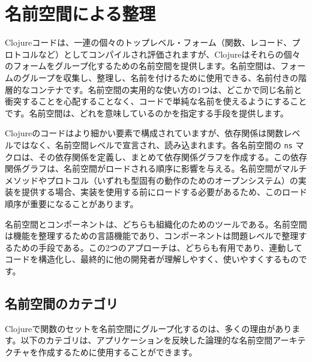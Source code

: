 \section{名前空間による整理}

Clojureコードは、一連の個々のトップレベル・フォーム（関数、レコード、プロトコルなど）としてコンパイルされ評価されますが、Clojureはそれらの個々のフォームをグループ化するための名前空間を提供します。名前空間は、フォームのグループを収集し、整理し、名前を付けるために使用できる、名前付きの階層的なコンテナです。名前空間の実用的な使い方の1つは、どこかで同じ名前と衝突することを心配することなく、コードで単純な名前を使えるようにすることです。名前空間は、どれを意味しているのかを指定する手段を提供します。

Clojureのコードはより細かい要素で構成されていますが、依存関係は関数レベルではなく、名前空間レベルで宣言され、読み込まれます。各名前空間の \texttt{ns} マクロは、その依存関係を定義し、まとめて依存関係グラフを作成する。この依存関係グラフは、名前空間がロードされる順序に影響を与える。名前空間がマルチメソッドやプロトコル（いずれも型固有の動作のためのオープンシステム）の実装を提供する場合、実装を使用する前にロードする必要があるため、このロード順序が重要になることがあります。

名前空間とコンポーネントは、どちらも組織化のためのツールである。名前空間は機能を整理するための言語機能であり、コンポーネントは問題レベルで整理するための手段である。この2つのアプローチは、どちらも有用であり、連動してコードを構造化し、最終的に他の開発者が理解しやすく、使いやすくするものです。

\subsection{名前空間のカテゴリ}

Clojureで関数のセットを名前空間にグループ化するのは、多くの理由があります。以下のカテゴリは、アプリケーションを反映した論理的な名前空間アーキテクチャを作成するために使用することができます。

